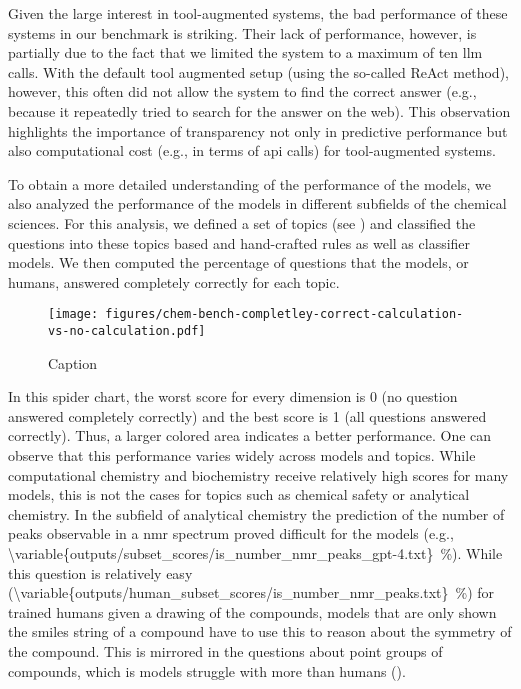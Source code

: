 \documentclass[11pt, oneside]{article}
\begin{document}
Given the large interest in tool-augmented systems, the bad performance of these systems in our benchmark is striking. 
Their lack of performance, however, is partially due to the fact that we limited the system to a maximum of ten \gls{llm} calls.
With the default tool augmented setup (using the so-called ReAct method), however, this often did not allow the system to find the correct answer (e.g., because it repeatedly tried to search for the answer on the web).
This observation highlights the importance of transparency not only in predictive performance but also computational cost (e.g., in terms of \gls{api} calls) for tool-augmented systems.


To obtain a more detailed understanding of the performance of the models, we also analyzed the performance of the models in different subfields of the chemical sciences.
For this analysis, we defined a set of topics (see ) and classified the questions into these topics based and hand-crafted rules as well as classifier models.
We then computed the percentage of questions that the models, or humans, answered completely correctly for each topic.

\begin{figure}
    \centering
    \texttt{[image: figures/chem-bench-completley-correct-calculation-vs-no-calculation.pdf]}
    \caption{Caption}
    \label{fig:performance_by_topic}
\end{figure}

In this spider chart, the worst score for every dimension is 0 (no question answered completely correctly) and the best score is 1 (all questions answered correctly). 
Thus, a larger colored area indicates a better performance. 
One can observe that this performance varies widely across models and topics. 
While computational chemistry and biochemistry receive relatively high scores for many models, this is not the cases for topics such as chemical safety or analytical chemistry.
In the subfield of analytical chemistry the prediction of the number of peaks observable in a \gls{nmr} spectrum proved difficult for the models (e.g., \SI{\variable{outputs/subset_scores/is_number_nmr_peaks_gpt-4.txt}}{\percent}). 
While this question is relatively easy (\SI{\variable{outputs/human_subset_scores/is_number_nmr_peaks.txt}}{\percent}) for trained humans given a drawing of the compounds, models that are only shown the \gls{smiles} string of a compound have to use this to reason about the symmetry of the compound. 
This is mirrored in the questions about point groups of compounds, which is models struggle with more than humans ().
\end{document}
